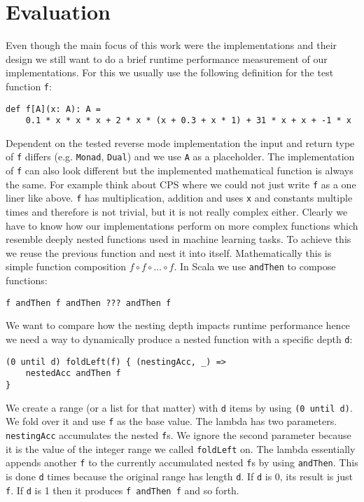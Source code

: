 \chapter{Evaluation}\label{sec:evaluation}

Even though the main focus of this work were the implementations and their design we still want to do a brief runtime performance measurement of our implementations. For this we usually use the following definition for the test function \lstinline{f}:
\begin{lstlisting}
def f[A](x: A): A =
    0.1 * x * x * x + 2 * x * (x + 0.3 + x * 1) + 31 * x + x + -1 * x
\end{lstlisting}
Dependent on the tested reverse mode implementation the input and return type of \lstinline{f} differs (e.g. \lstinline{Monad}, \lstinline{Dual}) and we use \lstinline{A} as a placeholder. The implementation of \lstinline{f} can also look different but the implemented mathematical function is always the same. For example think about CPS where we could not just write \lstinline{f} as a one liner like above.
\lstinline{f} has multiplication, addition and uses \lstinline{x} and constants multiple times and therefore is not trivial, but it is not really complex either. Clearly we have to know how our implementations perform on more complex functions which resemble deeply nested functions used in machine learning tasks. To achieve this we reuse the previous function and nest it into itself. Mathematically this is simple function composition
$f \circ f \circ \dots \circ f$. In Scala we use \lstinline{andThen} to compose functions:
\begin{lstlisting}
f andThen f andThen ??? andThen f
\end{lstlisting}
We want to compare how the nesting depth impacts runtime performance hence we need a way to dynamically produce a nested function with a specific depth \lstinline{d}:
\begin{lstlisting}
(0 until d) foldLeft(f) { (nestingAcc, _) =>
    nestedAcc andThen f
}
\end{lstlisting}
We create a range (or a list for that matter) with \lstinline{d} items by using \lstinline{(0 until d)}. We fold over it and use \lstinline{f} as the base value. The lambda has two parameters. \lstinline{nestingAcc} accumulates the nested \lstinline{f}s. We ignore the second parameter because it is the value of the integer range we called \lstinline{foldLeft} on. The lambda essentially appends another \lstinline{f} to the currently accumulated nested \lstinline{f}s by using \lstinline{andThen}. This is done \lstinline{d} times because the original range has length \lstinline{d}. If \lstinline{d} is 0, its result is just \lstinline{f}. If \lstinline{d} is 1 then it produces \lstinline{f andThen f} and so forth.

